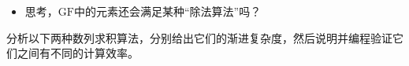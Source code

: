 \begin{problemset}
\begin{itemize}
     \item 思考，$\mathrm{GF}$中的元素还会满足某种“除法算法”吗？
  \end{itemize}
  \item 分析以下两种数列求积算法，分别给出它们的渐进复杂度，然后说明并编程验证它们之间有不同的计算效率。

	\begin{center}
		
	\end{center}

		\begin{center}
			
		\end{center}
\end{problemset}
